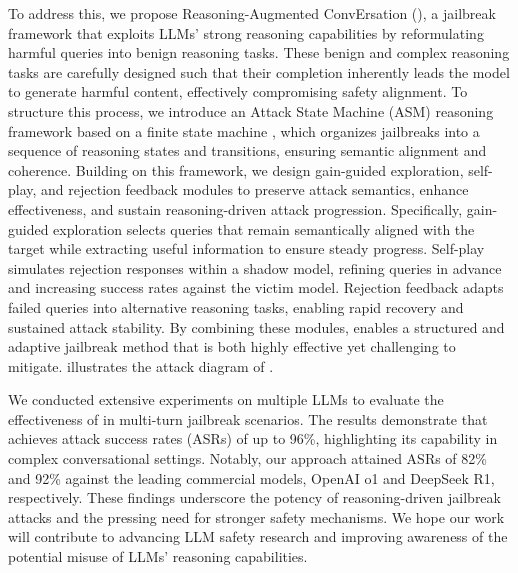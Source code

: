 To address this, we propose Reasoning-Augmented ConvErsation (\method{}), a jailbreak framework that exploits LLMs' strong reasoning capabilities \cite{reasonllm1,reasonllm2} by reformulating harmful queries into benign reasoning tasks. These benign and complex reasoning tasks are carefully designed such that their completion inherently leads the model to generate harmful content, effectively compromising safety alignment. To structure this process, we introduce an Attack State Machine (ASM) reasoning framework based on a finite state machine \cite{fsmbase2,fsmbase1}, which organizes jailbreaks into a sequence of reasoning states and transitions, ensuring semantic alignment and coherence. Building on this framework, we design gain-guided exploration, self-play, and rejection feedback modules to preserve attack semantics, enhance effectiveness, and sustain reasoning-driven attack progression. Specifically, gain-guided exploration selects queries that remain semantically aligned with the target while extracting useful information to ensure steady progress. Self-play simulates rejection responses within a shadow model, refining queries in advance and increasing success rates against the victim model. Rejection feedback adapts failed queries into alternative reasoning tasks, enabling rapid recovery and sustained attack stability. By combining these modules, \method{} enables a structured and adaptive jailbreak method that is both highly effective yet challenging to mitigate.  illustrates the attack diagram of \method{}.

We conducted extensive experiments on multiple LLMs to evaluate the effectiveness of \method{} in multi-turn jailbreak scenarios. The results demonstrate that \method{} achieves attack success rates (ASRs) of up to 96\%, highlighting its capability in complex conversational settings. Notably, our approach attained ASRs of 82\% and 92\% against the leading commercial models, OpenAI o1 and DeepSeek R1, respectively. These findings underscore the potency of reasoning-driven jailbreak attacks and the pressing need for stronger safety mechanisms. We hope our work will contribute to advancing LLM safety research and improving awareness of the potential misuse of LLMs' reasoning capabilities.